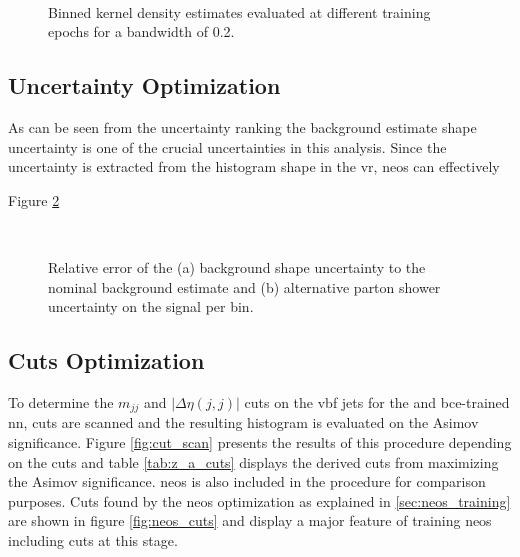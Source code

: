 \begin{figure}
    \centering
    \\
    \caption[]{Binned kernel density estimates evaluated at different training epochs for a bandwidth of 0.2.}
    \label{fig:neos_valid_kde_hists}
\end{figure}



\subsection{Uncertainty Optimization}
As can be seen from the uncertainty ranking the background estimate shape uncertainty is one of the crucial uncertainties in this analysis. Since the uncertainty is extracted from the histogram shape in the \ac{vr}, \ac{neos} can effectively 




Figure \ref{fig:neos_valid_bkg_shape_sys}
\begin{figure}
    \centering
    \\
    \caption[]{Relative error of the (a) background shape uncertainty to the nominal background estimate and (b) alternative parton shower uncertainty on the signal per bin.}
    \label{fig:neos_valid_bkg_shape_sys}
\end{figure}

\subsection{Cuts Optimization}
To determine the $m_{jj}$ and $|\Delta\eta(j,j)|$ cuts on the \ac{vbf} jets for the \mhh and \ac{bce}-trained \ac{nn}, cuts are scanned and the resulting histogram is evaluated on the Asimov significance. Figure \ref{fig:cut_scan} presents the results of this procedure depending on the cuts and table \ref{tab:z_a_cuts} displays the derived cuts from maximizing the Asimov significance. \ac{neos} is also included in the procedure for comparison purposes. Cuts found by the \ac{neos} optimization as explained in \ref{sec:neos_training} are shown in figure \ref{fig:neos_cuts} and display a major feature of training \ac{neos} including cuts at this stage.




